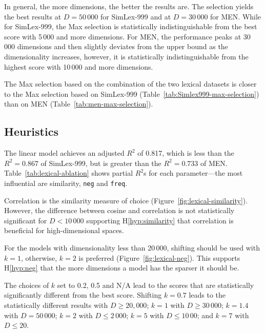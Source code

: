 In general, the more dimensions, the better the results are. The selection yields the best results at $D = 50\,000$ for SimLex-999 and at $D = 30\,000$ for MEN. While for SimLex-999, the Max selection is statistically indistinguishable from the best score with 5\,000 and more dimensions. For MEN, the performance peaks at 30\,000 dimensions and then slightly deviates from the upper bound as the dimensionality increases, however, it is statistically indistinguishable from the highest score with 10\,000 and more dimensions.

The Max selection based on the combination of the two lexical datasets is closer to the Max selection based on SimLex-999 (Table~\ref{tab:Simlex999-max-selection}) than on MEN (Table~\ref{tab:men-max-selection}).



\subsection{Heuristics}



The linear model achieves an adjusted $R^2$ of 0.817, which is less than the $R^2 = 0.867$ of SimLex-999, but is greater than the $R^2 = 0.733$ of MEN. Table~\ref{tab:lexical-ablation} shows partial $R^2$s for each parameter---the most influential are similarity, \texttt{neg} and \texttt{freq}.

 Correlation is the similarity measure of choice (Figure~\ref{fig:lexical-similarity}). However, the difference between cosine and correlation is not statistically significant for $D < 10\,000$ supporting H\ref{hyp:similarity} that correlation is beneficial for high-dimensional spaces.



For the models with dimensionality less than 20\,000, shifting should be used with $k = 1$, otherwise, $k = 2$ is preferred (Figure~\ref{fig:lexical-neg}). This supports H\ref{hyp:neg} that the more dimensions a model has the sparser it should be.

The choices of $k$ set to 0.2, 0.5 and N/A lead to the scores that are statistically significantly different from the best score. Shifting $k = 0.7$ leads to the statistically different results with $D \ge 20,000$; $k = 1$ with $D \ge 30\,000$; $k = 1.4$ with $D = 50\,000$; $k = 2$ with $D \le 2\,000$; $k = 5$ with $D \le 10\,00$; and $k = 7$ with $D \le 20$.

